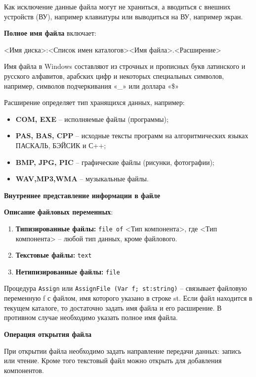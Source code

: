 Как исключение данные файла могут не храниться, а вводиться с внешних устройств (ВУ), например клавиатуры или выводиться на ВУ, например экран.

\noindent
{\bf Полное имя файла} включает:

<Имя диска>:<Список имен каталогов><Имя файла>.<Расширение>

Имя файла в Windows составляют из строчных и прописных букв латинского и русского алфавитов, арабских цифр и некоторых специальных символов, например, символов подчеркивания «\_» или доллара «\$»

\noindent
Расширение определяет тип хранящихся данных, например:

\begin{itemize}
	\item {\bf COM, EXE} – исполняемые файлы (программы);
	\item {\bf PAS, BAS, CPP} – исходные тексты программ на алгоритмических языках  ПАСКАЛЬ, БЭЙСИК и С++;
	\item {\bf BMP, JPG, PIC} – графические файлы (рисунки, фотографии); 
	\item {\bf WAV,MP3,WMA} – музыкальные файлы.
\end{itemize}

\noindent
{\bf {Внутреннее представление информации в файле}}


\noindent
{\bf {Описание файловых переменных}}:

\begin{enumerate}

\item {\bf Типизированные файлы:} \texttt{file of} <Тип компонента>, где  <Тип компонента> – любой тип данных, кроме файлового.
\item {\bf Текстовые файлы:} \texttt{text}
\item {\bf Нетипизированные файлы:} \texttt{file}

\end{enumerate}

Процедура \texttt{Assign} или \texttt{AssignFile (Var f; st:string)} – связывает файловую переменную f с файлом, имя которого указано в строке st.  
Если файл находится в текущем каталоге, то достаточно задать имя файла и его расширение. В противном случае необходимо указать полное имя файла.

\noindent
{\bf Операция открытия файла}

При открытии файла необходимо задать направление передачи данных: запись или чтение. Кроме того текстовый файл можно открыть для добавления компонентов.

